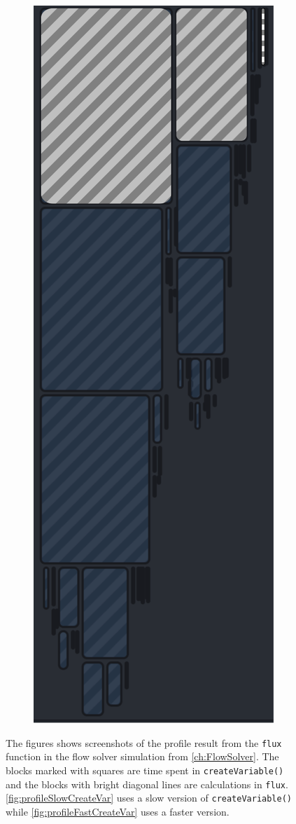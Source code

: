 \begin{figure}[H]
\begin{subfigure}[t]{0.18\textwidth}
        \includegraphics[height = 0.35\textheight, width=\textwidth]{figures/profilingFastCreateVariablesFlux.png}
        \caption{}
        \label{fig:profileFastCreateVar}
    \end{subfigure}
    \caption{The figures shows screenshots of the profile result from the \texttt{flux} function in the flow solver simulation from \autoref{ch:FlowSolver}. The blocks marked with squares are time spent in \texttt{createVariable()} and the blocks with bright diagonal lines are calculations in \texttt{flux}. \autoref{fig:profileSlowCreateVar} uses a slow version of \texttt{createVariable()} while \autoref{fig:profileFastCreateVar} uses a faster version.}
\end{figure}
